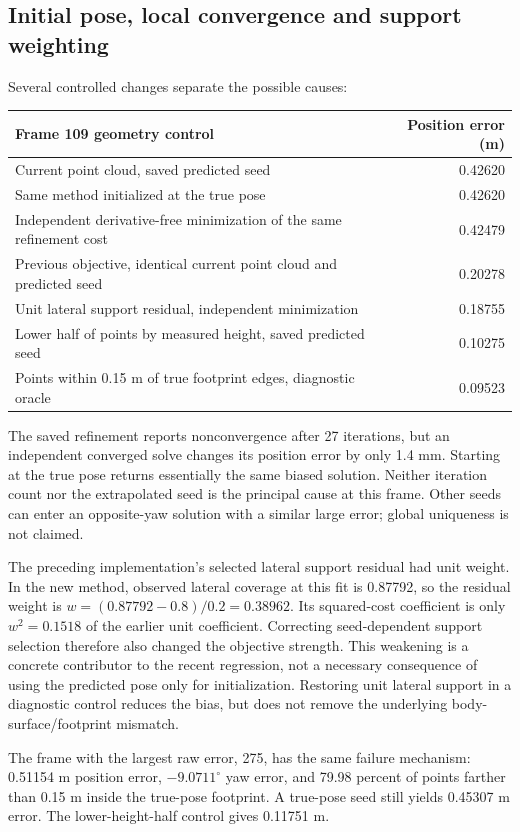 \documentclass[11pt]{article}
\begin{document}
\subsection{Initial pose, local convergence and support weighting}
Several controlled changes separate the possible causes:
\begin{center}\small
\begin{tabular}{@{}lr@{}}\toprule
Frame 109 geometry control & Position error (m) \\\midrule
Current point cloud, saved predicted seed & 0.42620 \\
Same method initialized at the true pose & 0.42620 \\
Independent derivative-free minimization of the same refinement cost & 0.42479 \\
Previous objective, identical current point cloud and predicted seed & 0.20278 \\
Unit lateral support residual, independent minimization & 0.18755 \\
Lower half of points by measured height, saved predicted seed & 0.10275 \\
Points within 0.15 m of true footprint edges, diagnostic oracle & 0.09523 \\
\bottomrule\end{tabular}
\end{center}
The saved refinement reports nonconvergence after 27 iterations, but an
independent converged solve changes its position error by only 1.4 mm.
Starting at the true pose returns essentially the same biased solution.
Neither iteration count nor the extrapolated seed is the principal cause
at this frame. Other seeds can enter an opposite-yaw solution with a similar
large error; global uniqueness is not claimed.

The preceding implementation's selected lateral support residual had unit
weight. In the new method, observed lateral coverage at this fit is 0.87792,
so the residual weight is
$w=(0.87792-0.8)/0.2=0.38962$. Its squared-cost coefficient is only
$w^2=0.1518$ of the earlier unit coefficient. Correcting seed-dependent
support selection therefore also changed the objective strength. This
weakening is a concrete contributor to the recent regression, not a necessary
consequence of using the predicted pose only for initialization. Restoring
unit lateral support in a diagnostic control reduces the bias, but does not
remove the underlying body-surface/footprint mismatch.

The frame with the largest raw error, 275, has the same failure mechanism:
0.51154 m position error, $-9.0711^\circ$ yaw error, and 79.98 percent of
points farther than 0.15 m inside the true-pose footprint. A true-pose seed
still yields 0.45307 m error. The lower-height-half control gives 0.11751 m.
\end{document}
